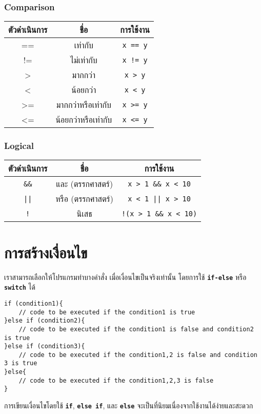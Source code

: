 \subsubsection{Comparison}
\begin{center}
\begin{tabular}{||c|c|c||}
\hline
\textbf{ตัวดำเนินการ} & \textbf{ชื่อ} & \textbf{การใช้งาน} \\
\hline
== & เท่ากับ & \texttt{x == y} \\
!= & ไม่เท่ากับ & \texttt{x != y} \\
> & มากกว่า & \texttt{x > y} \\
< & น้อยกว่า & \texttt{x < y} \\
>= & มากกว่าหรือเท่ากับ & \texttt{x >= y} \\
<= & น้อยกว่าหรือเท่ากับ & \texttt{x <= y} \\
\hline
\end{tabular}
\end{center}

\subsubsection{Logical}
\begin{center}
\begin{tabular}{||c|c|c||}
\hline
\textbf{ตัวดำเนินการ} & \textbf{ชื่อ} & \textbf{การใช้งาน} \\
\hline
\texttt{\&\&} & และ (ตรรกศาสตร์) & \texttt{x > 1 \&\& x < 10} \\
\texttt{||} & หรือ (ตรรกศาสตร์) & \texttt{x < 1 || x > 10} \\
\texttt{!} & นิเสธ & \texttt{!(x > 1 \&\& x < 10)} \\
\hline
\end{tabular}
\end{center}

\newpage
\section{การสร้างเงื่อนไข}
เราสามารถเลือกให้โปรแกรมทำบางคำสั่ง เมื่อเงื่อนไขเป็นจริงเท่านั้น โดยการใช้ \textbf{\texttt{if-else}} หรือ \textbf{\texttt{switch}} ได้
\begin{lstlisting}
if (condition1){
	// code to be executed if the condition1 is true
}else if (condition2){
	// code to be executed if the condition1 is false and condition2 is true
}else if (condition3){
	// code to be executed if the condition1,2 is false and condition 3 is true
}else{
	// code to be executed if the condition1,2,3 is false
}
\end{lstlisting}
การเขียนเงื่อนไขโดยใช้ \textbf{\texttt{if}}, \textbf{\texttt{else if}}, และ \textbf{\texttt{else}} จะเป็นที่นิยมเนื่องจากใช้งานได้ง่ายและสะดวก


